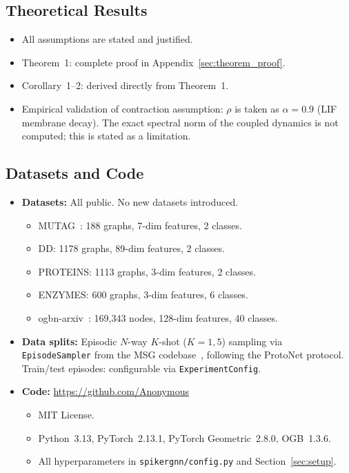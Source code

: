 \subsection*{Theoretical Results}

\begin{itemize}
    \item[\checkmark] All assumptions are stated and justified.
    \item[\checkmark] Theorem~1: complete proof in Appendix~\ref{sec:theorem_proof}.
    \item[\checkmark] Corollary~1--2: derived directly from Theorem~1.
    \item[-] Empirical validation of contraction assumption: $\rho$ is taken as $\alpha=0.9$ (LIF membrane decay). The exact spectral norm of the coupled dynamics is not computed; this is stated as a limitation.
\end{itemize}

\subsection*{Datasets and Code}

\begin{itemize}
    \item \textbf{Datasets:} All public. No new datasets introduced.
    \begin{itemize}
        \item MUTAG~\citep{MUTAG}: 188 graphs, 7-dim features, 2 classes.
        \item DD: 1178 graphs, 89-dim features, 2 classes.
        \item PROTEINS: 1113 graphs, 3-dim features, 2 classes.
        \item ENZYMES: 600 graphs, 3-dim features, 6 classes.
        \item ogbn-arxiv~\citep{hu2020open}: 169,343 nodes, 128-dim features, 40 classes.
    \end{itemize}
    \item \textbf{Data splits:} Episodic $N$-way $K$-shot ($K{=}1{,}5$) sampling via \texttt{EpisodeSampler} from the MSG codebase~\citep{Sun24MSG}, following the ProtoNet protocol. Train/test episodes: configurable via \texttt{ExperimentConfig}.
    \item \textbf{Code:} \url{https://github.com/Anonymous}
    \begin{itemize}
        \item MIT License.
        \item Python~3.13, PyTorch~2.13.1, PyTorch Geometric~2.8.0, OGB~1.3.6.
        \item All hyperparameters in \texttt{spikergnn/config.py} and Section~\ref{sec:setup}.
    \end{itemize}
\end{itemize}


